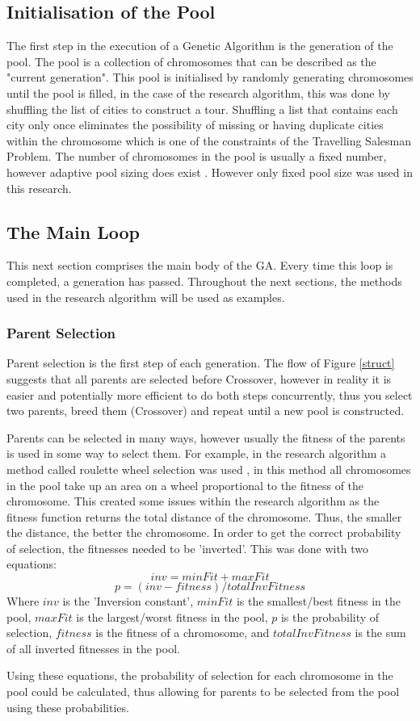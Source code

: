\subsection{Initialisation of the Pool}
\par
The first step in the execution of a Genetic Algorithm is the generation of the pool. The pool is a collection of chromosomes that can be described as the "current generation". This pool is initialised by randomly generating chromosomes until the pool is filled, in the case of the research algorithm, this was done by shuffling the list of cities to construct a tour. Shuffling a list that contains each city only once eliminates the possibility of missing or having duplicate cities within the chromosome which is one of the constraints of the Travelling Salesman Problem. The number of chromosomes in the pool is usually a fixed number, however adaptive pool sizing does exist \cite{populationsize}. However only fixed pool size was used in this research. 
\subsection{The Main Loop}
\par
This next section comprises the main body of the GA. Every time this loop is completed, a generation has passed. Throughout the next sections, the methods used in the research algorithm will be used as examples.
\subsubsection{Parent Selection}\label{parents}
\par
Parent selection is the first step of each generation. The flow of Figure \ref{struct} suggests that all parents are selected before Crossover, however in reality it is easier and potentially more efficient to do both steps concurrently, thus you select two parents, breed them (Crossover) and repeat until a new pool is constructed.
\par
Parents can be selected in many ways, however usually the fitness of the parents is used in some way to select them. For example, in the research algorithm a method called roulette wheel selection was used \cite{Slides}, in this method all chromosomes in the pool take up an area on a wheel proportional to the fitness of the chromosome. This created some issues within the research algorithm as the fitness function returns the total distance of the chromosome. Thus, the smaller the distance, the better the chromosome. In order to get the correct probability of selection, the fitnesses needed to be 'inverted'. This was done with two equations: 
\[ inv = minFit + maxFit\]
\[ p = (inv - fitness)/totalInvFitness\]
Where $inv$ is the 'Inversion constant', $minFit$ is the smallest/best fitness in the pool, $maxFit$ is the largest/worst fitness in the pool, $p$ is the probability of selection, $fitness$ is the fitness of a chromosome, and $totalInvFitness$ is the sum of all inverted fitnesses in the pool.
\par
Using these equations, the probability of selection for each chromosome in the pool could be calculated, thus allowing for parents to be selected from the pool using these probabilities.
